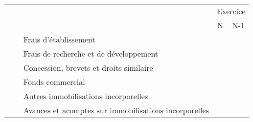 

\begin{table}[h]
\renewcommand{\arraystretch}{1.2}
\footnotesize
\centering
\begin{tabular}{|l|p{0.2cm}|p{6cm}|c|c|}
\cline{4-5}
                                                                                \multicolumn{3}{c|}{}                                                                  &  \multicolumn{2}{c|}{Exercice} \\
\cline{4-5}                                                                                                                                                           
                                                                                \multicolumn{3}{c|}{}                         				                          &   {\scriptsize \phantom{-}N\phantom{1}} & {\scriptsize N-1} \\
\hline                                                                                                                                                                
\parbox[t]{2mm}{} 
    & \parbox[t]{3cm}{} 
                 &  Frais d'établissement                                               &     &   \\ 
    &             &  Frais de recherche et de développement                                           &     &   \\ 
    &             &  Concession, brevets et droits similaire                                        &     &   \\ 
    &             &  Fonds commercial                                              &     &   \\ 
    &             &  Autres immobilisations incorporelles	                                                  &     &   \\ 
    &             &  Avances et acomptes sur immobilisations incorporelles                                               &     &   \\ 

\end{tabular}
\end{table}
